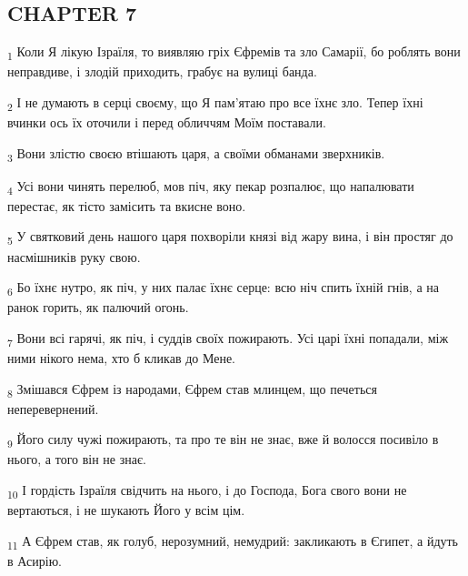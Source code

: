 \subsection{CHAPTER 7}
\begin{tcolorbox}
\textsubscript{1} Коли Я лікую Ізраїля, то виявляю гріх Єфремів та зло Самарії, бо роблять вони неправдиве, і злодій приходить, грабує на вулиці банда.
\end{tcolorbox}
\begin{tcolorbox}
\textsubscript{2} І не думають в серці своєму, що Я пам'ятаю про все їхнє зло. Тепер їхні вчинки ось їх оточили і перед обличчям Моїм поставали.
\end{tcolorbox}
\begin{tcolorbox}
\textsubscript{3} Вони злістю своєю втішають царя, а своїми обманами зверхників.
\end{tcolorbox}
\begin{tcolorbox}
\textsubscript{4} Усі вони чинять перелюб, мов піч, яку пекар розпалює, що напалювати перестає, як тісто замісить та вкисне воно.
\end{tcolorbox}
\begin{tcolorbox}
\textsubscript{5} У святковий день нашого царя похворіли князі від жару вина, і він простяг до насмішників руку свою.
\end{tcolorbox}
\begin{tcolorbox}
\textsubscript{6} Бо їхнє нутро, як піч, у них палає їхнє серце: всю ніч спить їхній гнів, а на ранок горить, як палючий огонь.
\end{tcolorbox}
\begin{tcolorbox}
\textsubscript{7} Вони всі гарячі, як піч, і суддів своїх пожирають. Усі царі їхні попадали, між ними нікого нема, хто б кликав до Мене.
\end{tcolorbox}
\begin{tcolorbox}
\textsubscript{8} Змішався Єфрем із народами, Єфрем став млинцем, що печеться неперевернений.
\end{tcolorbox}
\begin{tcolorbox}
\textsubscript{9} Його силу чужі пожирають, та про те він не знає, вже й волосся посивіло в нього, а того він не знає.
\end{tcolorbox}
\begin{tcolorbox}
\textsubscript{10} І гордість Ізраїля свідчить на нього, і до Господа, Бога свого вони не вертаються, і не шукають Його у всім цім.
\end{tcolorbox}
\begin{tcolorbox}
\textsubscript{11} А Єфрем став, як голуб, нерозумний, немудрий: закликають в Єгипет, а йдуть в Асирію.
\end{tcolorbox}
